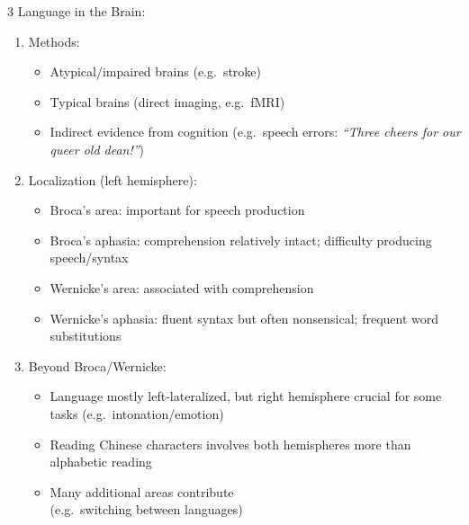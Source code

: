 \documentclass[12pt, a4paper]{article}
\begin{document}
\begin{multicols*}{3}
Language in the Brain:
\begin{enumerate}[\roman*.]
  \item Methods:
    \begin{itemize}[leftmargin=*]\vspace{3pt}
      \item Atypical/impaired brains (e.g.\ stroke)
      \item Typical brains (direct imaging, e.g.\ fMRI)
      \item Indirect evidence from cognition (e.g.\ speech errors: \textit{``Three cheers for our queer old dean!''})
    \end{itemize}
  \item Localization (left hemisphere):
    \begin{itemize}[leftmargin=*]\vspace{3pt}
      \item Broca's area: important for speech production
      \item Broca's aphasia: comprehension relatively intact; difficulty producing speech/syntax
      \item Wernicke's area: associated with comprehension
      \item Wernicke's aphasia: fluent syntax but often nonsensical; frequent word substitutions
    \end{itemize}
  \item Beyond Broca/Wernicke:
    \begin{itemize}[leftmargin=*]\vspace{3pt}
      \item Language mostly left-lateralized, but right hemisphere crucial for some tasks (e.g.\ intonation/emotion)
      \item Reading Chinese characters involves both hemispheres more than alphabetic reading
      \item Many additional areas contribute\\(e.g.\ switching between languages)
    \end{itemize}
\end{enumerate}


\end{multicols*}
\end{document}
